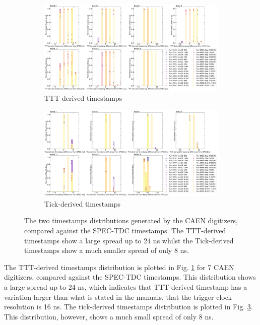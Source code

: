 \begin{figure}[htbp!]

\begin{subfigure}[h]{1.00\linewidth}
\centering    
\includegraphics[width=\linewidth]{TTTts_spec}
\caption{TTT-derived timestamps}
\label{subfig:TTTts_spec}
\end{subfigure}

\hfill
\begin{subfigure}[h]{1.00\linewidth}
\centering    
\includegraphics[width=\linewidth]{Tickts_spec}
\caption{Tick-derived timestamps}
\label{subfig:Tickts_spec}
\end{subfigure}%

\caption[TTTtsTickts]{
The two timestamps distributions generated by the CAEN digitizers, compared against the SPEC-TDC timestamps.
The TTT-derived timestamps show a large spread up to 24 ns whilst the Tick-derived timestamps show a much smaller spread of only 8 ns.
}
\end{figure}

The TTT-derived timestamps distribution is plotted in Fig. \ref {subfig:TTTts_spec} for 7 CAEN digitizers, compared against the SPEC-TDC timestamps.
This distribution shows a large spread up to 24 ns, which indicates that TTT-derived timestamp has a variation larger than what is stated in the manuals, that the trigger clock resolution is 16 ns.
The tick-derived timestamps distribution is plotted in Fig. \ref {subfig:Tickts_spec}.
This distribution, however, shows a much small spread of only 8 ns.

